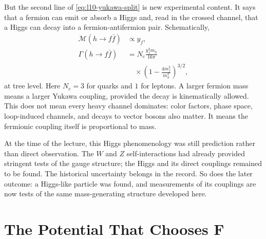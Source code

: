 But the second line of \eqref{eq:l10-yukawa-split} is new experimental
content. It says that a fermion can emit or absorb a Higgs and, read in the
crossed channel, that a Higgs can decay into a fermion-antifermion pair.
Schematically,
\begin{equation}
\begin{aligned}
  \mathcal M(h\to f\bar f)&\propto y_f,
  \\
  \Gamma(h\to f\bar f)
  &=
  N_c\frac{y_f^2m_h}{16\pi}
  \\
  &\quad\times
  \left(1-\frac{4m_f^2}{m_h^2}\right)^{3/2},
\end{aligned}
  \label{eq:l10-higgs-fermion-width}
\end{equation}
at tree level. Here \(N_c=3\) for quarks and \(1\) for leptons. A larger
fermion mass means a larger Yukawa coupling, provided the decay is
kinematically allowed. This does not mean every heavy channel dominates:
color factors, phase space, loop-induced channels, and decays to vector
bosons also matter. It means the fermionic coupling itself is proportional
to mass.

\begin{classroomqa}
\end{classroomqa}

At the time of the lecture, this Higgs phenomenology was still prediction
rather than direct observation. The \(W\) and \(Z\) self-interactions had
already provided stringent tests of the gauge structure; the Higgs and its
direct couplings remained to be found. The historical uncertainty belongs
in the record. So does the later outcome: a Higgs-like particle was found,
and measurements of its couplings are now tests of the same mass-generating
structure developed here.

\section{The Potential That Chooses F}

